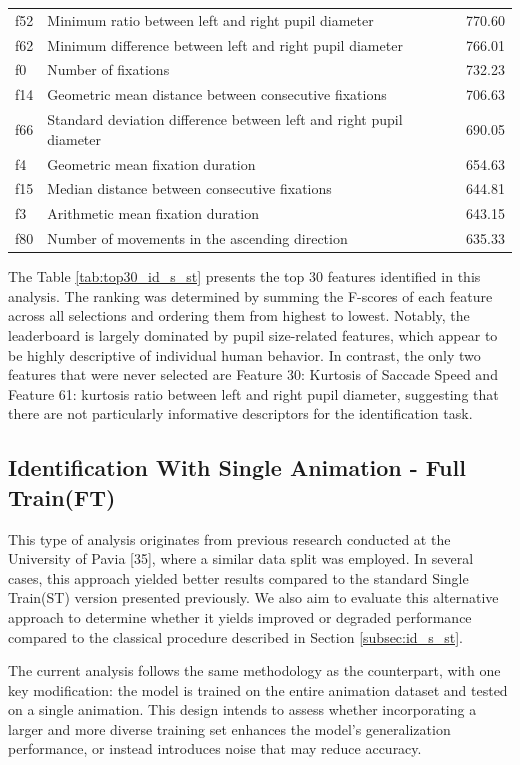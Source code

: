 \documentclass[12pt]{report}
\begin{document}
\begin{table}[htbp]
\begin{tabular}{lll}
f52 & Minimum ratio between left and right pupil diameter & 770.60 \\
f62 & Minimum difference between left and right pupil diameter & 766.01 \\
f0 & Number of fixations & 732.23 \\
f14 & Geometric mean distance between consecutive fixations & 706.63 \\
f66 & Standard deviation difference between left and right pupil diameter & 690.05 \\
f4 & Geometric mean fixation duration & 654.63 \\
f15 & Median distance between consecutive fixations & 644.81 \\
f3 & Arithmetic mean fixation duration & 643.15 \\
f80 & Number of movements in the ascending direction & 635.33 \\
\bottomrule
\end{tabular}
\end{table}

The Table \ref{tab:top30_id_s_st} presents the top 30 features identified in this analysis.
The ranking was determined by summing the F-scores of each feature across all selections and ordering them from highest to lowest.
Notably, the leaderboard is largely dominated by pupil size-related features, which appear to be highly descriptive of individual human behavior.
In contrast, the only two features that were never selected are Feature 30: Kurtosis of Saccade Speed and Feature 61: kurtosis ratio between left and right pupil diameter, suggesting that there are not particularly informative descriptors for the identification task.
\FloatBarrier

\subsection{Identification With Single Animation - Full Train(FT)}
\label{subsec:id_s_ft}

This type of analysis originates from previous research conducted at the University of Pavia [35], where a similar data split was employed. 
In several cases, this approach yielded better results compared to the standard Single Train(ST) version presented previously.
We also aim to evaluate this alternative approach to determine whether it yields improved or degraded performance compared to the classical procedure described in Section \ref{subsec:id_s_st}. 

The current analysis follows the same methodology as the counterpart, with one key modification: the model is trained on the entire animation dataset and tested on a single animation. 
This design intends to assess whether incorporating a larger and more diverse training set enhances the model's generalization performance, or instead introduces noise that may reduce accuracy.
\end{document}
